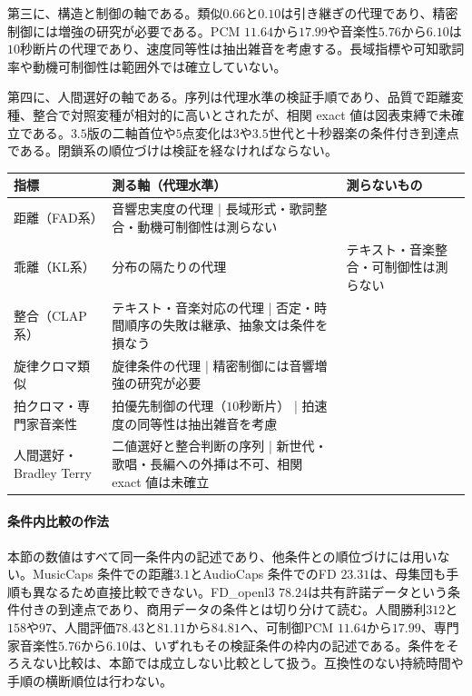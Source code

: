\documentclass[lualatex,a4paper,10pt]{jlreq}
\begin{document}
第三に、構造と制御の軸である。類似$0.66$と$0.10$は引き継ぎの代理であり、精密制御には増強の研究が必要である\autocite{btd066}。PCM $11.64$から$17.99$や音楽性$5.76$から$6.10$は$10$秒断片の代理であり、速度同等性は抽出雑音を考慮する\autocite{btd069}。長域指標や可知歌詞率や動機可制御性は範囲外では確立していない\autocite{btd063,btd065}。

第四に、人間選好の軸である。序列は代理水準の検証手順であり、品質で距離変種、整合で対照変種が相対的に高いとされたが、相関 exact 値は図表束縛で未確立である\autocite{btd136}。$3.5$版の二軸首位や$5$点変化は$3$や$3.5$世代と十秒器楽の条件付き到達点である\autocite{btd136}。閉鎖系の順位づけは検証を経なければならない\autocite{btd136}。

\begin{center}
\small
\begin{tabularx}{\textwidth}{@{}p{}p{}X@{}}
\toprule
指標 & 測る軸（代理水準） & 測らないもの \\
\midrule
距離（FAD系）\autocite{btd065,btd066} & 音響忠実度の代理 | 長域形式・歌詞整合・動機可制御性は測らない \\
乖離（KL系）\autocite{btd065,btd066} & 分布の隔たりの代理 & テキスト・音楽整合・可制御性は測らない \\
整合（CLAP系）\autocite{btd065,btd068} & テキスト・音楽対応の代理 | 否定・時間順序の失敗は継承\autocite{btd065}、抽象文は条件を損なう\autocite{btd067} \\
旋律クロマ類似\autocite{btd066} & 旋律条件の代理 | 精密制御には音響増強の研究が必要 \\
拍クロマ・専門家音楽性\autocite{btd069} & 拍優先制御の代理（$10$秒断片） | 拍速度の同等性は抽出雑音を考慮 \\
人間選好・Bradley Terry\autocite{btd136} & 二値選好と整合判断の序列 | 新世代・歌唱・長編への外挿は不可、相関 exact 値は未確立 \\
\bottomrule
\end{tabularx}
\end{center}

\paragraph{条件内比較の作法}
本節の数値はすべて同一条件内の記述であり、他条件との順位づけには用いない\autocite{btd066}。MusicCaps 条件での距離$3.1$とAudioCaps 条件でのFD $23.31$は、母集団も手順も異なるため直接比較できない\autocite{btd066,btd067}。FD\_openl3 $78.24$は共有許諾データという条件付きの到達点であり、商用データの条件とは切り分けて読む\autocite{btd068}。人間勝利$312$と$158$や$97$、人間評価$78.43$と$81.11$から$84.81$へ、可制御PCM $11.64$から$17.99$、専門家音楽性$5.76$から$6.10$は、いずれもその検証条件の枠内の記述である\autocite{btd065,btd066,btd069}。条件をそろえない比較は、本節では成立しない比較として扱う\autocite{btd063,btd065,btd066,btd067,btd068,btd069,btd136}。互換性のない持続時間や手順の横断順位は行わない\autocite{btd136}。
\end{document}
